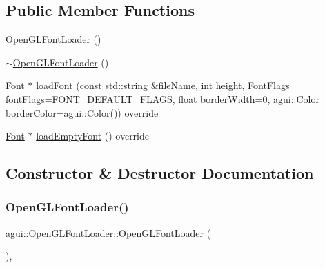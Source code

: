 \subsection*{Public Member Functions}
\begin{DoxyCompactItemize}
\item 
\mbox{\hyperlink{classagui_1_1_open_g_l_font_loader_a82158e551d0a68d104b1601311ff5669}{Open\+G\+L\+Font\+Loader}} ()
\item 
\mbox{\hyperlink{classagui_1_1_open_g_l_font_loader_ad187229f4cc62cd91ee90e6431e0cd2e}{$\sim$\+Open\+G\+L\+Font\+Loader}} ()
\item 
\mbox{\hyperlink{class_font}{Font}} $\ast$ \mbox{\hyperlink{classagui_1_1_open_g_l_font_loader_a6f90ac8ad2a2d11c6423d5c9559e3f65}{load\+Font}} (const std\+::string \&file\+Name, int height, Font\+Flags font\+Flags=F\+O\+N\+T\+\_\+\+D\+E\+F\+A\+U\+L\+T\+\_\+\+F\+L\+A\+GS, float border\+Width=0, agui\+::\+Color border\+Color=agui\+::\+Color()) override
\item 
\mbox{\hyperlink{class_font}{Font}} $\ast$ \mbox{\hyperlink{classagui_1_1_open_g_l_font_loader_af11760c16e9f88ee6c534a914897096e}{load\+Empty\+Font}} () override
\end{DoxyCompactItemize}


\subsection{Constructor \& Destructor Documentation}
\mbox{\label{classagui_1_1_open_g_l_font_loader_a82158e551d0a68d104b1601311ff5669}} 
\subsubsection{\texorpdfstring{Open\+G\+L\+Font\+Loader()}{OpenGLFontLoader()}}
{\footnotesize\ttfamily agui\+::\+Open\+G\+L\+Font\+Loader\+::\+Open\+G\+L\+Font\+Loader (\begin{DoxyParamCaption}{ }\end{DoxyParamCaption})\hspace{0.3cm}{\ttfamily [explicit]}, {\ttfamily [default]}}

\mbox{\label{classagui_1_1_open_g_l_font_loader_ad187229f4cc62cd91ee90e6431e0cd2e}} 
